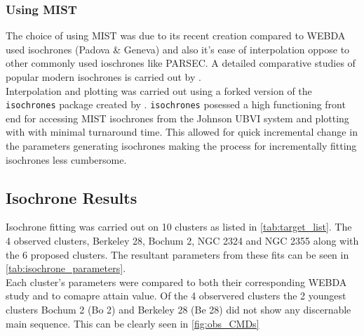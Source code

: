 \subsubsection{Using MIST}
The choice of using MIST was due to its recent creation compared to WEBDA used isochrones (Padova \& Geneva) and also it's ease of interpolation oppose to other commonly used ioschrones like PARSEC. A detailed comparative studies of popular modern isochrones is carried out by \cite{2022MNRAS.512.5717A}. \\ 
Interpolation and plotting was carried out using a forked version of the \verb|isochrones| package created by \cite{2015ascl.soft03010M}. \verb|isochrones| posessed a high functioning front end for accessing MIST isochrones from the Johnson UBVI system and plotting with with minimal turnaround time. This allowed for quick incremental change in the parameters generating isochrones making the process for incrementally fitting isochrones less cumbersome. 


\subsection{Isochrone Results}

Isochrone fitting was carried out on 10 clusters as listed in \cref{tab:target_list}. The 4 observed clusters, Berkeley 28, Bochum 2, NGC 2324 and NGC 2355 along with the 6 proposed clusters. The resultant parameters from these fits can be seen in \cref{tab:isochrone_parameters}. \\ Each cluster's parameters were compared to both their corresponding WEBDA study and \cite{2020A&A...640A...1C} to comapre attain value. Of the 4 observered clusters the 2 youngest clusters Bochum 2 (Bo 2) and Berkeley 28 (Be 28) did not show any discernable main sequence. This can be clearly seen in \cref{fig:obs_CMDs}



